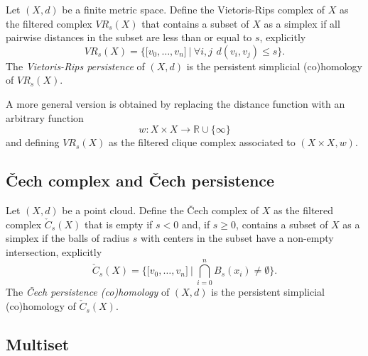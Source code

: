 \documentclass{amsart}
\begin{document}
	Let $(X, d)$ be a 
	finite metric space. Define the Vietoris-Rips complex of $X$ as the
	filtered complex $VR_s(X)$ that contains a subset of $X$ as a simplex if all pairwise distances in the subset are less than or equal to $s$, explicitly
	\begin{equation*}
	VR_s(X) = \Big\{ \lbrack v_0,\dots,v_n \rbrack \ \Big|\ \forall i,j\ \,d(v_i, v_j) \leq s \Big\}.
	\end{equation*}
	The \textit{Vietoris-Rips persistence} of $(X, d)$ is the 
	persistent simplicial (co)homology of $VR_s(X)$.
	
	A more general version is obtained by replacing the distance function with an arbitrary function
	\begin{equation*}
	w : X \times X \to \mathbb R \cup \{\infty\}
	\end{equation*}
	and defining $VR_s(X)$ as the 
	filtered clique complex associated to $(X \times X ,w)$.
	
	
	\subsection*{\v{C}ech complex and \v{C}ech persistence} \label{cech_complex_and_cech_persistence}
	
	Let $(X, d)$ be a 
	point cloud. Define the \v{C}ech complex of $X$ as the 
	filtered complex $\check{C}_s(X)$ that is empty if $s<0$ and, if $s \geq 0$, contains a subset of $X$ as a simplex if the balls of radius $s$ with centers in the subset have a non-empty intersection, explicitly
	\begin{equation*}
	\check{C}_s(X) = \Big\{ \lbrack v_0,\dots,v_n \rbrack \ \Big|\ \bigcap_{i=0}^n B_s(x_i) \neq \emptyset \Big\}.
	\end{equation*}
	The \textit{\v Cech persistence (co)homology} of $(X,d)$ is the 
	persistent simplicial (co)homology of $\check{C}_s(X)$.
	
	\subsection*{Multiset} \label{multiset}
	
\end{document}
